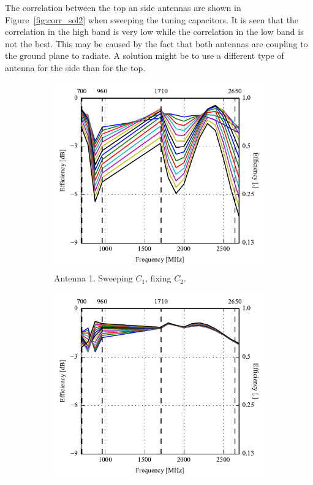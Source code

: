 The correlation between the top an side antennas are shown in Figure~\ref{fig:corr_sol2} when sweeping the tuning capacitors. It is seen that the correlation in the high band is very low while the correlation in the low band is not the best. This may be caused by the fact that both antennas are coupling to the ground plane to radiate. A solution might be to use a different type of antenna for the side than for the top.

\begin{figure}[htbp]
    \centering
    \begin{subfigure}{0.49\linewidth}
        \centering
        \includegraphics{img/tech_sol/trianglefeed/efficiency-ac1.pdf}
        \caption{Antenna 1. Sweeping $C_1$, fixing $C_2$.}
    \end{subfigure}
    \hfill
    \begin{subfigure}{0.49\linewidth}
        \centering
        \includegraphics{img/tech_sol/trianglefeed/efficiency-ac2.pdf}

\end{subfigure}
\end{figure}

